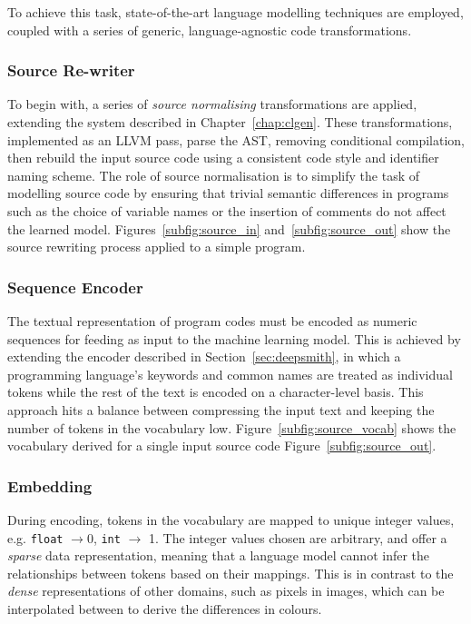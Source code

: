 To achieve this task, state-of-the-art language modelling techniques are employed, coupled with a series of generic, language-agnostic code transformations.

\subsubsection{Source Re-writer}

To begin with, a series of \emph{source normalising} transformations are applied, extending the system described in Chapter~\ref{chap:clgen}. These transformations, implemented as an LLVM pass, parse the AST, removing conditional compilation, then rebuild the input source code using a consistent code style and identifier naming scheme. The role of source normalisation is to simplify the task of modelling source code by ensuring that trivial semantic differences in programs such as the choice of variable names or the insertion of comments do not affect the learned model. Figures~\ref{subfig:source_in} and~\ref{subfig:source_out} show the source rewriting process applied to a simple program.

\subsubsection{Sequence Encoder}

The textual representation of program codes must be encoded as numeric sequences for feeding as input to the machine learning model. This is achieved by extending the encoder described in Section~\ref{sec:deepsmith}, in which a programming language's keywords and common names are treated as individual tokens while the rest of the text is encoded on a character-level basis. This approach hits a balance between compressing the input text and keeping the number of tokens in the vocabulary low. Figure~\ref{subfig:source_vocab} shows the vocabulary derived for a single input source code Figure~\ref{subfig:source_out}.

\subsubsection{Embedding}

During encoding, tokens in the vocabulary are mapped to unique integer values, e.g. \texttt{float} $\rightarrow 0$, \texttt{int} $\rightarrow$ 1. The integer values chosen are arbitrary, and offer a \emph{sparse} data representation, meaning that a language model cannot infer the relationships between tokens based on their mappings. This is in contrast to the \emph{dense} representations of other domains, such as pixels in images, which can be interpolated between to derive the differences in colours.

